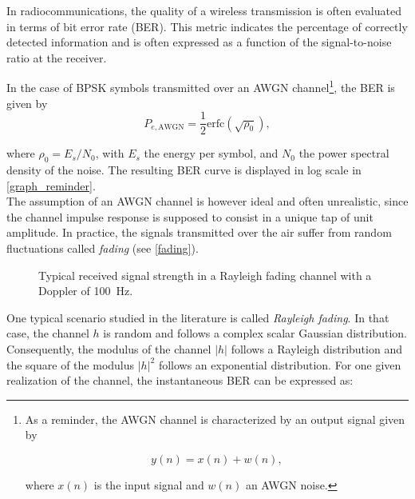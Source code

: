 \documentclass [a4paper, 11pt] {article}
\begin{document}
    \makesessiontitle

    \begin{reminder}

    In radiocommunications, the quality of a wireless transmission is often evaluated in terms of bit error rate (BER). This metric indicates the percentage of correctly detected information and is often expressed as a function of the signal-to-noise ratio at the receiver.


    In the case of BPSK symbols transmitted over an AWGN channel\footnote{As a reminder, the AWGN channel is characterized by an output signal given by

    \begin{equation}
        y(n) = x(n) + w(n),
    \end{equation}


    where $x(n)$ is the input signal and $w(n)$ an AWGN noise.}, the BER is given by
    \begin{equation}
        P_{e,\text{AWGN}}= \frac{1}{2}\text{erfc}(\sqrt{\rho_0}),
    \end{equation}


    where $\rho_0 = E_s/N_0$, with $E_s$ the energy per symbol, and $N_0$ the power spectral density of the noise. The resulting BER curve is displayed in log scale in \autoref{graph_reminder}. \\


    The assumption of an AWGN channel is however ideal and often unrealistic, since the channel impulse response is supposed to consist in a unique tap of unit amplitude. In practice, the signals transmitted over the air suffer from random fluctuations called \textit{fading} (see \autoref{fading}).

    \begin{figure}[H]
        \centering
        \caption{Typical received signal strength in a Rayleigh fading channel with a Doppler of \SI{100}{\hertz}.}
        \label{fading}
    \end{figure}

    One typical scenario studied in the literature is called \textit{Rayleigh fading}. In that case, the channel $h$ is random and follows a complex scalar Gaussian distribution. Consequently, the modulus of the channel $|h|$ follows a Rayleigh distribution and the square of the modulus $|h|^2$ follows an exponential distribution. For one given realization of the channel, the instantaneous BER can be expressed as:


\end{reminder}
\end{document}

